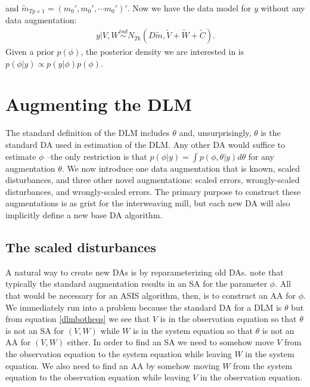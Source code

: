 \documentclass[12pt]{article}
\begin{document}
and $\tilde{m}_{Tp\times 1} = (m_0', m_0', \cdots m_0')'$. Now we have the data model for $y$ without any data augmentation:
\begin{align}
  y|V,W \stackrel{ind}{\sim} N_{Tk}(D\tilde{m}, \tilde{V} + \tilde{W} + \tilde{C}). \label{margmodel}
\end{align}
Given a prior $p(\phi)$, the posterior density we are interested in is $p(\phi|y)\propto p(y|\phi)p(\phi)$.

\section{Augmenting the DLM}\label{sec:DAs}

The standard definition of the DLM includes $\theta$ and, unsurprisingly, $\theta$ is the standard DA used in estimation of the DLM. Any other DA would suffice to estimate $\phi$ --the only restriction is that $p(\phi|y) = \int p(\phi,\theta|y)d\theta$ for any augmentation $\theta$. We now introduce one data augmentation that is known, scaled disturbances, and three other novel augmentations: scaled errors, wrongly-scaled disturbances, and wrongly-scaled errors.
The primary purpose to construct these augmentations is as grist for the interweaving mill, but each new DA will also implicitly define a new base DA algorithm.

\subsection{The scaled disturbances}\label{sec:DAs:dist}

A natural way to create new DAs is by reparameterizing old DAs. \citet{papaspiliopoulos2007general} note that typically the standard augmentation results in an SA for the parameter $\phi$. All that would be necessary for an ASIS algorithm, then, is to construct an AA for $\phi$. We immediately run into a problem because the standard DA for a DLM is $\theta$ but from equation \eqref{dlmbotheqs} we see that $V$ is in the observation equation so that $\theta$ is not an SA for $(V,W)$ while $W$ is in the system equation so that $\theta$ is not an AA for $(V,W)$ either. In order to find an SA we need to somehow move $V$ from the observation equation to the system equation while leaving $W$ in the system equation. We also need to find an AA by somehow moving $W$ from the system equation to the observation equation while leaving $V$ in the observation equation.
\end{document}
